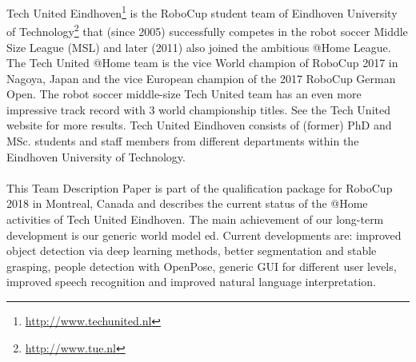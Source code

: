 Tech United Eindhoven\footnote{\url{http://www.techunited.nl}} is the RoboCup student team of Eindhoven University of Technology\footnote{\url{http://www.tue.nl}} that (since 2005) successfully competes in the robot soccer Middle Size League (MSL) and later (2011) also joined the ambitious @Home League. The Tech United @Home team is the vice World champion of RoboCup 2017 in Nagoya, Japan and the vice European champion of the 2017 RoboCup German Open. The robot soccer middle-size Tech United team has an even more impressive track record with 3 world championship titles. See the Tech United website for more results. Tech United Eindhoven consists of (former) PhD and MSc. students and staff members from different departments within the Eindhoven University of Technology.
\\\\
This Team Description Paper is part of the qualification package for RoboCup 2018 in Montreal, Canada and describes the current status of the @Home activities of Tech United Eindhoven. The main achievement of our long-term development is our generic world model \acrshort{ed}. Current developments are: improved object detection via deep learning methods, better segmentation and stable grasping, people detection with OpenPose, generic GUI for different user levels, improved speech recognition and improved natural language interpretation. 